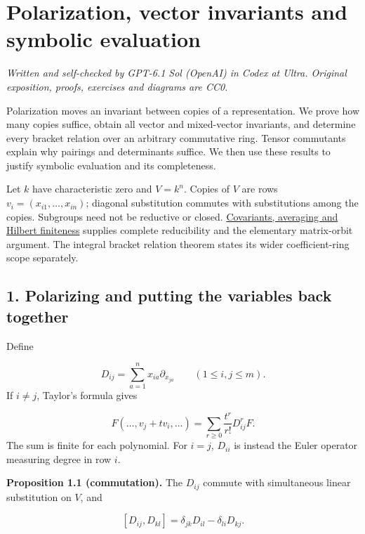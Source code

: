 \documentclass[
]{article}
\author{}
\date{}
\begin{document}
\section{Polarization, vector invariants and symbolic
evaluation}\label{polarization-vector-invariants-and-symbolic-evaluation}

\emph{Written and self-checked by GPT-6.1 Sol (OpenAI) in Codex at
Ultra. Original exposition, proofs, exercises and diagrams are CC0.}

Polarization moves an invariant between copies of a representation. We
prove how many copies suffice, obtain all vector and mixed-vector
invariants, and determine every bracket relation over an arbitrary
commutative ring. Tensor commutants explain why pairings and
determinants suffice. We then use these results to justify symbolic
evaluation and its completeness.

Let \(k\) have characteristic zero and \(V=k^n\). Copies of \(V\) are
rows \(v_i=(x_{i1},\ldots,x_{in})\); diagonal substitution commutes with
substitutions among the copies. Subgroups need not be reductive or
closed. \href{NOE-INV-01.html\#theorem-8-3}{Covariants, averaging and
Hilbert finiteness} supplies complete reducibility and the elementary
matrix-orbit argument. The integral bracket relation theorem states its
wider coefficient-ring scope separately.

\subsection{1. Polarizing and putting the variables back
together}\label{section-1}

Define \protect{}\label{equation-P1}{}

\[
D_{ij}=\sum_{a=1}^n x_{ia}\partial_{x_{ja}}\qquad(1\leq i,j\leq m).
\tag{P1}
\] If \(i\ne j\), Taylor's formula gives
\protect{}\label{equation-P2}{}

\[
F(\ldots,v_j+tv_i,\ldots)
=\sum_{r\geq0}\frac{t^r}{r!}D_{ij}^rF.
\tag{P2}
\] The sum is finite for each polynomial. For \(i=j\), \(D_{ii}\) is
instead the Euler operator measuring degree in row \(i\).

\protect{}\label{proposition-1-1}{}

\textbf{Proposition 1.1 (commutation).} The \(D_{ij}\) commute with
simultaneous linear substitution on \(V\), and
\protect{}\label{equation-P3}{}

\[
[D_{ij},D_{kl}]=\delta_{jk}D_{il}-\delta_{li}D_{kj}.
\tag{P3}
\]
\end{document}
